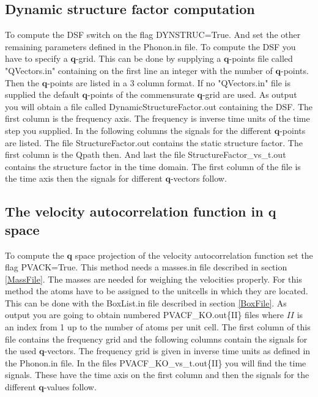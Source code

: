 \documentclass[a4paper,12pt]{article}
\begin{document}
\subsection{Dynamic structure factor computation}
To compute the DSF switch on the flag DYNSTRUC=True. And set the other remaining parameters
defined in the Phonon.in file. To compute the DSF you have to specify a $\mathbf{q}$-grid.
This can be done by supplying a $\mathbf{q}$-points file called "QVectors.in" containing on the first line
an integer with the number of $\mathbf{q}$-points. Then the $\mathbf{q}$-points are listed in
a 3 column format. If no "QVectors.in" file is supplied the default $\mathbf{q}$-points
of the commensurate $\mathbf{q}$-grid are used. As output you will obtain a file called
DynamicStructureFactor.out containing the DSF. The first column is the frequency axis. 
The frequency is inverse time units of the time step you supplied.
In the following columns the signals for the different $\mathbf{q}$-points are listed.
The file StructureFactor.out contains the static structure factor. The first column is
the Qpath then. And last the file StructureFactor\_vs\_t.out contains the structure factor in the
time domain. The first column of the file is the time axis then the signals for different 
$\mathbf{q}$-vectors follow.




\subsection{The velocity autocorrelation function in $\mathbf{q}$ space}
To compute the $\mathbf{q}$ space projection of the velocity autocorrelation function
set the flag PVACK=True. This method needs a masses.in file described
in section \ref{MassFile}. The masses are needed for weighing the velocities properly.
For this method the atoms have to be assigned to the unitcells
in which they are located. This can be done with the BoxList.in file described in
section \ref{BoxFile}. As output you are going to obtain numbered PVACF\_KO.out\{II\}
files where $II$ is an index from 1 up to the number of atoms per unit cell.
The first column of this file contains the frequency grid and the following columns
contain the signals for the used $\mathbf{q}$-vectors.
The frequency grid is given in inverse time units as
defined in the Phonon.in file. In the files PVACF\_KO\_vs\_t.out\{II\} you will find
the time signals. These have the time axis on the first column and then
the signals for the different $\mathbf{q}$-values follow.
\end{document}
